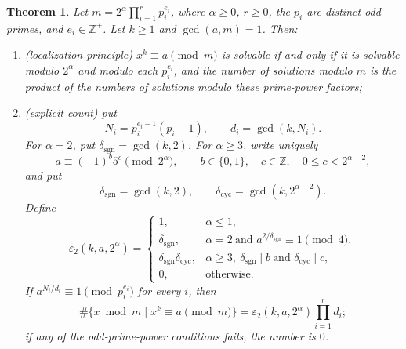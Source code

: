 \documentclass[11pt]{article}
\theoremstyle{ntstyle}
\newtheorem{theorem}{Theorem}[subsection]
\begin{document}
\begin{theorem}\label{thm:7.8.2}
	Let
	$m=2^\alpha\prod_{i=1}^r p_i^{e_i}$, where $\alpha\ge0$, $r\ge0$, the $p_i$
	are distinct odd primes, and $e_i\in\mathbb{Z}^+$. Let $k\ge1$ and
	$\gcd(a,m)=1$. Then:

	\begin{enumerate}[label={\alph*)}]
		\item (localization principle) $x^{k}\equiv a\pmod{m}$ is solvable
					if and only if it is solvable modulo $2^{\alpha}$ and modulo each
					$p_i^{e_i}$, and the number of solutions modulo $m$ is the product
					of the numbers of solutions modulo these prime-power factors;
		\item (explicit count) put
					\[
						N_i=p_i^{e_i-1}(p_i-1),\qquad d_i=\gcd(k,N_i).
					\]
					For $\alpha=2$, put
					$\delta_{\mathrm{sgn}}=\gcd(k,2)$. For $\alpha\ge3$, write
					uniquely
					\[
						a\equiv(-1)^b5^c\pmod{2^\alpha},\qquad
						b\in\{0,1\},\quad c\in\mathbb{Z},\quad
						0\le c<2^{\alpha-2},
					\]
					and put
					\[
						\delta_{\mathrm{sgn}}=\gcd(k,2),\qquad
						\delta_{\mathrm{cyc}}=\gcd(k,2^{\alpha-2}).
					\]
					Define
					\[
						\varepsilon_2(k,a,2^\alpha)=
						\begin{cases}
							1, & \alpha\le1,\\
							\delta_{\mathrm{sgn}},
							& \alpha=2\ \text{and }a^{2/\delta_{\mathrm{sgn}}}
								\equiv1\pmod{4},\\
							\delta_{\mathrm{sgn}}\delta_{\mathrm{cyc}},
							& \alpha\ge3,\
								\delta_{\mathrm{sgn}}\mid b\
								\text{and }\delta_{\mathrm{cyc}}\mid c,\\
							0, & \text{otherwise}.
						\end{cases}
					\]
					If $a^{N_i/d_i}\equiv1\pmod{p_i^{e_i}}$ for every $i$, then
					\[
						\#\{x\bmod m \mid x^k\equiv a\pmod{m}\}
						=\varepsilon_2(k,a,2^\alpha)\prod_{i=1}^r d_i;
					\]
					if any of the odd-prime-power conditions fails, the number is $0$.
	\end{enumerate}
\end{theorem}
\end{document}
